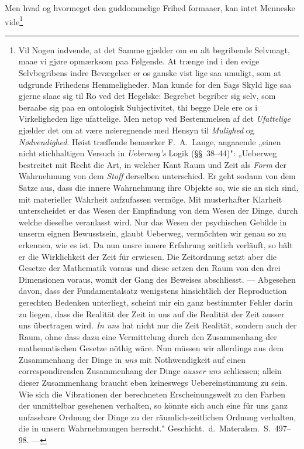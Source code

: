 \documentclass[12pt]{article}
\begin{document}
Men hvad og hvormeget den guddommelige Frihed formaaer, kan intet
Menneske vide\footnote{Vil Nogen indvende, at det Samme gjælder om en
alt begribende Selvmagt, maae vi gjøre opmærksom paa Følgende. At
trænge ind i den evige Selvbegribens indre Bevægelser er os ganske
vist lige saa umuligt, som at udgrunde Frihedens Hemmeligheder. Man
kunde for den Sags Skyld lige saa gjerne slaae sig til Ro ved det
Hegelske: Begrebet begriber sig selv, som beraabe sig paa en
ontologisk Subjectivitet, thi begge Dele ere os i Virkeligheden lige
ufattelige. Men netop ved Bestemmelsen af det \emph{Ufattelige}
gjælder det om at være nøieregnende med Hensyn til \emph{Mulighed} og
\emph{Nødvendighed}. Høist træffende bemærker F.\ A.\ Lange, angaaende
„einen nicht stichhaltigen Versuch in \emph{Ueberweg's} Logik
(§§~38--44)": „Ueberweg bestreitet mit Recht die Art, in welcher Kant
Raum und Zeit als \emph{Form} der Wahrnehmung von dem \emph{Stoff}
derselben unterschied. Er geht sodann von dem Satze aus, dass die
innere Wahrnehmung ihre Objekte so, wie sie an sich sind, mit
materieller Wahrheit aufzufassen vermöge. Mit musterhafter Klarheit
unterscheidet er das Wesen der Empfindung von dem Wesen der Dinge,
durch welche dieselbe veranlasst wird. Nur das Wesen der psychischen
Gebilde in unserm eignen Bewusstsein, glaubt Ueberweg, vermöchten wir
genau so zu erkennen, wie es ist. Da nun unsre innere Erfahrung
zeitlich verläuft, so hält er die Wirklichkeit der Zeit für erwiesen.
Die Zeitordnung setzt aber die Gesetze der Mathematik voraus und diese
setzen den Raum von den drei Dimensionen voraus, womit der Gang des
Beweises abschliesst. --- Abgesehen davon, dass der Fundamentalsatz
wenigstens hinsichtlich der Reproduction gerechten Bedenken unterliegt,
scheint mir ein ganz bestimmter Fehler darin zu liegen, dass die
Realität der Zeit in uns auf die Realität der Zeit ausser uns
übertragen wird. \emph{In uns} hat nicht nur die Zeit Realität,
sondern auch der Raum, ohne dass dazu eine Vermittelung durch den
Zusammenhang der mathematischen Gesetze nöthig wäre. Nun müssen wir
allerdings aus dem Zusammenhang der Dinge in \emph{uns} mit
Nothwendigkeit auf einen correspondirenden Zusammenhang der Dinge
\emph{ausser uns} schliessen; allein dieser Zusammenhang braucht eben
keineswegs Uebereinstimmung zu sein. Wie sich die Vibrationen der
berechneten Erscheinungswelt zu den Farben der unmittelbar gesehenen
verhalten, so könnte sich auch eine für uns ganz unfassbare Ordnung
der Dinge zu der räumlich-zeitlichen Ordnung verhalten, die in unsern
Wahrnehmungen herrscht." Geschicht.\ d.\ Materalsm.\ S.\ 497--98. ---
}
\end{document}
